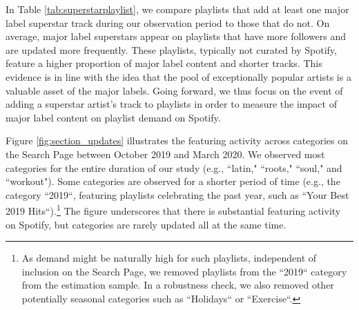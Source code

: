 




In Table \ref{tab:superstarplaylist}, we compare playlists that add at least one major label superstar track during our observation period to those that do not. On average, major label superstars appear on playlists that have more followers and are updated more frequently. These playlists, typically not curated by Spotify, feature a higher proportion of major label content and shorter tracks. This evidence is in line with the idea that the pool of exceptionally popular artists is a valuable asset of the major labels. Going forward, we thus focus on the event of adding a superstar artist's track to playlists in order to measure the impact of major label content on playlist demand on Spotify.%







Figure \ref{fig:section_updates} illustrates the featuring activity across categories on the Search Page between October 2019 and March 2020. We observed most categories for the entire duration of our study (e.g., ``latin," ``roots," ``soul," and ``workout"). Some categories are observed for a shorter period of time (e.g., the category ``2019``, featuring playlists celebrating the past year, such as ``Your Best 2019 Hits``).\footnote{As demand might be naturally high for such playlists, independent of inclusion on the Search Page, we removed playlists from the ``2019`` category from the estimation sample. In a robustness check, we also removed other potentially seasonal categories such as ``Holidays`` or ``Exercise``.} %
The figure underscores that there is substantial featuring activity on Spotify, but categories are rarely updated all at the same time. 

